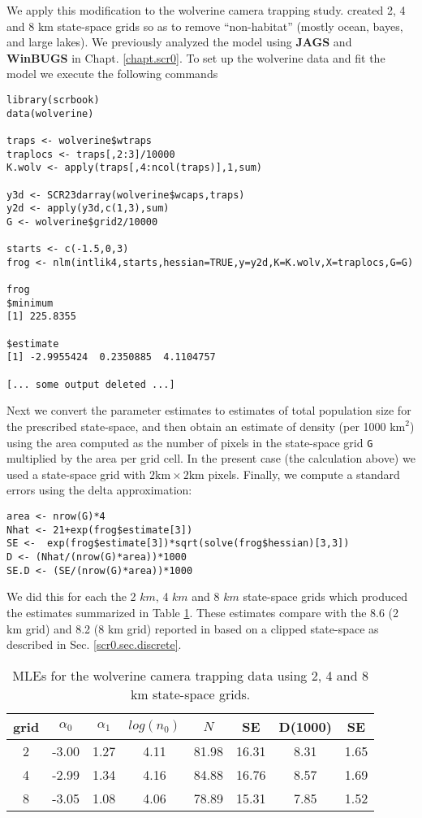We apply this modification to the wolverine camera trapping
study. \citet{royle_etal:2011jwm} created 2, 4 and 8 km state-space
grids so as to remove ``non-habitat'' (mostly ocean, bayes, and large
lakes). We previously analyzed the model using {\bf JAGS} and {\bf WinBUGS} in
Chapt. \ref{chapt.scr0}.  To set up the wolverine data and fit the
model we execute the following commands
{\small 
\begin{verbatim}
library(scrbook)
data(wolverine)

traps <- wolverine$wtraps
traplocs <- traps[,2:3]/10000
K.wolv <- apply(traps[,4:ncol(traps)],1,sum)

y3d <- SCR23darray(wolverine$wcaps,traps)
y2d <- apply(y3d,c(1,3),sum)
G <- wolverine$grid2/10000

starts <- c(-1.5,0,3)
frog <- nlm(intlik4,starts,hessian=TRUE,y=y2d,K=K.wolv,X=traplocs,G=G)

frog
$minimum
[1] 225.8355

$estimate
[1] -2.9955424  0.2350885  4.1104757

[... some output deleted ...]
\end{verbatim}
}

Next we convert the parameter estimates to estimates of total
population size for the prescribed state-space, and then obtain an
estimate of density (per 1000
$\text{km}^2$) using the area computed as the number of pixels in the
state-space grid \mbox{\tt G} multiplied by the area per grid cell. In
the present case (the calculation above) we used a state-space grid
with $2 \text{km} \times 2 \text{km}$ pixels.  Finally, we compute
a standard errors using the delta approximation: 
\begin{verbatim}
area <- nrow(G)*4
Nhat <- 21+exp(frog$estimate[3])
SE <-  exp(frog$estimate[3])*sqrt(solve(frog$hessian)[3,3])
D <- (Nhat/(nrow(G)*area))*1000
SE.D <- (SE/(nrow(G)*area))*1000
\end{verbatim}
We did this for each the 2 $km$, 4 $km$ and 8 $km$ state-space grids
which produced the estimates summarized in Table \ref{mle.tab.wolv}.
These estimates compare with the 8.6 (2 km grid) and 8.2 (8 km grid)
reported in 
\citet{royle_etal:2011jwm} based on a clipped state-space as described
in Sec. \ref{scr0.sec.discrete}.

\begin{table}
\centering
\caption{MLEs for the wolverine camera trapping data using 2, 4 and 8 km state-space grids.}
\begin{tabular}{cccccccc}
\hline \hline
grid &  $\alpha_0$  &  $\alpha_1$ &   $log(n_0)$  & $N$   &  SE & D(1000) &  SE \\ \hline
2  &  -3.00 & 1.27 &4.11  &81.98& 16.31 &8.31 &1.65\\
4  &  -2.99 & 1.34  &4.16 &84.88& 16.76 &8.57& 1.69\\
8   & -3.05 & 1.08 &4.06  &78.89& 15.31 &7.85& 1.52\\   \hline
\end{tabular}
\label{mle.tab.wolv}
\end{table}


